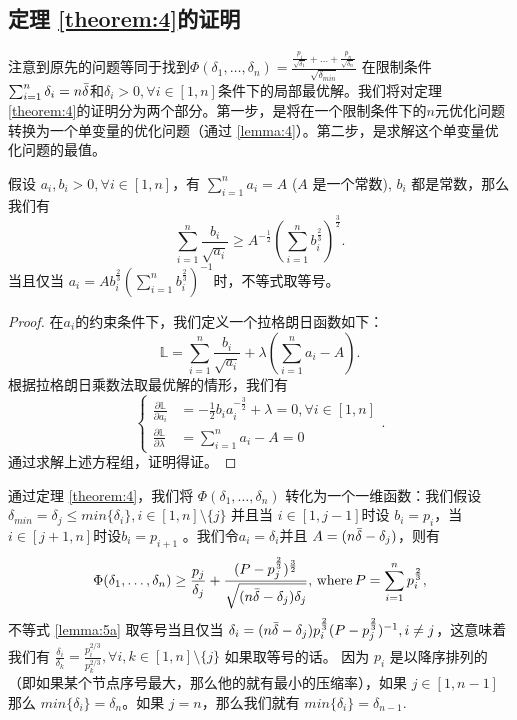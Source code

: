 \subsection{定理 \ref{theorem:4}的证明}

注意到原先的问题等同于找到$\Phi(\delta_1,\ldots,\delta_n)=\frac{\frac{p_1}{\sqrt{\delta_1}}+\ldots+\frac{p_n}{\sqrt{\delta_n}}}{\sqrt{\delta_{min}}}$ 在限制条件 $\sum_{i=1}^n \delta_i=n\Bar{\delta}$和$\delta_i >0, \forall i \in [1,n]$条件下的局部最优解。我们将对定理 \ref{theorem:4}的证明分为两个部分。第一步，是将在一个限制条件下的$n$元优化问题转换为一个单变量的优化问题（通过 \ref{lemma:4}）。第二步，是求解这个单变量优化问题的最值。

\begin{lemma}
假设 $a_i,b_i >0, \forall i \in [1,n]$，有 $\sum_{i=1}^n a_i=A$ ($A$ 是一个常数), $b_i$ 都是常数，那么我们有
\begin{equation}
    \sum_{i=1}^n \frac{b_i}{\sqrt{a_i}} \geq A^{-\frac{1}{2}}(\sum_{i=1}^n b_i^{\frac{2}{3}})^{\frac{3}{2}}.
\label{lemma:4}
\end{equation}
当且仅当 $a_i= A b_i^{\frac{2}{3}}(\sum_{i=1}^n b_i^{\frac{2}{3}})^{-1}$时，不等式取等号。
\end{lemma}
\begin{proof}
在$a_i$的约束条件下，我们定义一个拉格朗日函数如下：
\begin{equation}
\mathbb{L}=\sum_{i=1}^n \frac{b_i}{
\sqrt{a_i}}+\lambda (\sum_{i=1}^n a_i-A). \nonumber
\end{equation}
根据拉格朗日乘数法取最优解的情形，我们有
\begin{equation}
\left\{
             \begin{array}{ll}
             \frac{ \partial \mathbb{L} }{ \partial a_i }&=-\frac{1}{2}b_i a_i^{-\frac{3}{2}}+\lambda = 0,  \forall i \in [1,n]\\
             \frac{ \partial \mathbb{L} }{ \partial \lambda }&=\sum_{i=1}^n a_i-A=0 \nonumber
             \end{array}
\right. .
\end{equation}
通过求解上述方程组，证明得证。
\end{proof}

通过定理 \ref{theorem:4}，我们将 $\Phi(\delta_1,\ldots,\delta_n)$ 转化为一个一维函数：我们假设 $\delta_{min}=\delta_j \leq min\{\delta_i\}, i\in[1,n]\setminus \{j\}$ 并且当 $i\in[1,j-1]$时设 $b_i=p_i$，当 $i \in [j+1,n]$时设$b_i=p_{i+1}$ 。我们令$a_i=\delta_i$并且 $A=(n\Bar{\delta}-\delta_j)$，则有
\begin{equation}
    \Phi(\delta_1,\ldots,\delta_n) \geq \frac{p_j}{\delta_j} + \frac{(P-p_j^{\frac{2}{3}})^\frac{3}{2}}{\sqrt{(n\Bar{\delta}-\delta_j)\delta_j}},\,\text{where}\, P=\sum_{i=1}^n p_i^{\frac{2}{3}},
\label{lemma:5a}
\end{equation}
不等式 \ref{lemma:5a} 取等号当且仅当 $\delta_i= (n\Bar{\delta}-\delta_j) p_i^{\frac{2}{3}}(P-p_j^{\frac{2}{3}})^{-1}, i \neq j$，这意味着我们有 $\frac{\delta_i}{\delta_k}=\frac{p_i^{2/3}}{p_k^{2/3}}, \forall i,k\in[1,n]\setminus \{j\}$ 如果取等号的话。 因为 $p_i$ 是以降序排列的（即如果某个节点序号最大，那么他的就有最小的压缩率），如果 $j \in [1,n-1]$那么 $min\{\delta_i\}= \delta_n$。如果 $j=n$，那么我们就有 $min\{\delta_i\}=\delta_{n-1}$. 

